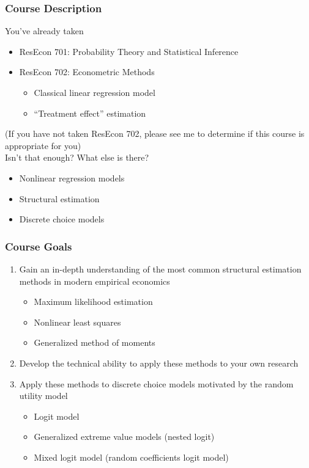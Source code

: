 \documentclass{beamer}
\begin{document}
\begin{frame}\frametitle{Course Description}
    You've already taken
    \begin{itemize}
        \item ResEcon 701: Probability Theory and Statistical Inference
        \item ResEcon 702: Econometric Methods
        \begin{itemize}
            \item Classical linear regression model
            \item ``Treatment effect'' estimation
        \end{itemize}
    \end{itemize}
    (If you have not taken ResEcon 702, please see me to determine if this course is appropriate for you) \\
    \vspace{3ex}
    Isn't that enough? What else is there?
    \begin{itemize}
        \item Nonlinear regression models 
        \item Structural estimation
        \item Discrete choice models
    \end{itemize}
\end{frame}

\begin{frame}\frametitle{Course Goals}
    \begin{enumerate}
        \item Gain an in-depth understanding of the most common structural estimation methods in modern empirical economics
        \begin{itemize}
            \item Maximum likelihood estimation
            \item Nonlinear least squares
            \item Generalized method of moments
        \end{itemize}
        \vspace{1ex} 
        \item Develop the technical ability to apply these methods to your own research
        \vspace{1ex}
        \item Apply these methods to discrete choice models motivated by the random utility model
        \begin{itemize}
            \item Logit model
            \item Generalized extreme value models (nested logit)
            \item Mixed logit model (random coefficients logit model)
        \end{itemize}
    \end{enumerate}
\end{frame}
\end{document}
